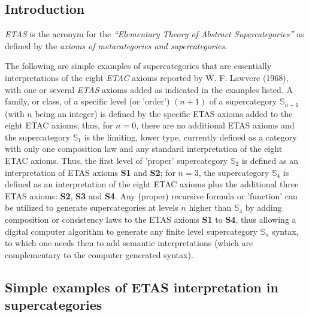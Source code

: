 \documentclass[12pt]{article}
\theoremstyle{plain}
\theoremstyle{definition}
\numberwithin{equation}{section}
\begin{document}
\subsection{Introduction}
 
  \emph{ETAS} is the acronym for the {\em ``Elementary Theory of Abstract Supercategories''}
as defined by the {\em axioms of metacategories and supercategories}.


  The following are simple examples of supercategories that are essentially interpretations
of the eight {\em ETAC} axioms reported by W. F. Lawvere (1968), with one or several \emph{ETAS} axioms added as indicated in the examples listed. A family, or class, of a specific level (or 'order') $(n+1)$ of a
supercategory $\mathbb{S}_{n+1}$ (with $n$ being an integer) is defined by the specific ETAS axioms added to the eight ETAC axioms; thus, for $n=0$, there are no additional ETAS axioms and the supercategory $\mathbb{S}_1$ is the limiting, lower type, currently defined as a category with only one composition law and any standard interpretation of the eight ETAC axioms. Thus, the first level of 'proper' supercategory  $\mathbb{S}_2$ is defined as an interpretation of ETAS axioms \textbf{S1} and \textbf{S2}; for $n=3$, the supercategory $\mathbb{S}_4$ is defined as an interpretation of the eight ETAC axioms plus the additional three ETAS axioms: \textbf{S2}, \textbf{S3} and \textbf{S4}. Any (proper) recursive formula or 'function' can be utilized to generate supercategories at levels $n$ higher than $\mathbb{S}_4$ by adding composition or consistency laws to the ETAS axioms \textbf{S1} to \textbf{S4}, thus allowing a digital computer algorithm to generate any finite level supercategory $\mathbb{S}_n$ syntax, to which one needs then to add semantic interpretations (which are complementary to the computer generated syntax). 
 

\subsection{Simple examples of ETAS interpretation in supercategories}
\end{document}
